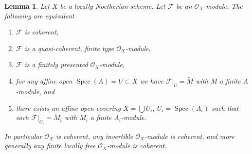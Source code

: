 \documentclass{stacks-project}
\theoremstyle{plain}
\newtheorem{lemma}[subsection]{Lemma}
\theoremstyle{definition}
\theoremstyle{remark}
\numberwithin{equation}{subsection}
\def\Spec{\mathop{\mathrm{Spec}}}
\begin{document}
\begin{lemma}
\label{lemma-coherent-Noetherian}
Let $X$ be a locally Noetherian scheme.
Let $\mathcal{F}$ be an $\mathcal{O}_X$-module.
The following are equivalent
\begin{enumerate}
\item $\mathcal{F}$ is coherent,
\item $\mathcal{F}$ is a quasi-coherent, finite type $\mathcal{O}_X$-module,
\item $\mathcal{F}$ is a finitely presented $\mathcal{O}_X$-module,
\item for any affine open $\Spec(A) = U \subset X$ we have
$\mathcal{F}|_U = \widetilde M$ with $M$ a finite $A$-module, and
\item there exists an affine open covering $X = \bigcup U_i$,
$U_i = \Spec(A_i)$ such that each
$\mathcal{F}|_{U_i} = \widetilde M_i$ with $M_i$ a finite $A_i$-module.
\end{enumerate}
In particular $\mathcal{O}_X$ is coherent, any invertible
$\mathcal{O}_X$-module is coherent, and more generally any
finite locally free $\mathcal{O}_X$-module is coherent.
\end{lemma}
\end{document}
